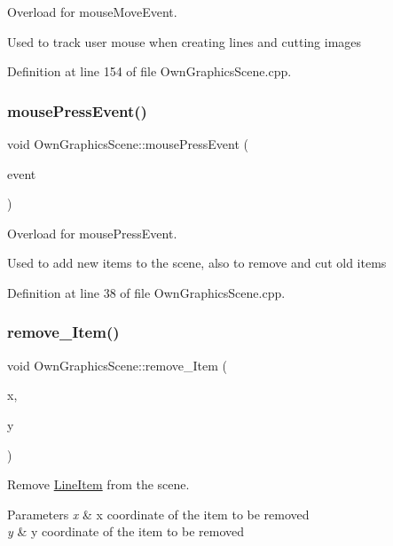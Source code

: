 Overload for mouse\+Move\+Event. 

Used to track user mouse when creating lines and cutting images 

Definition at line 154 of file Own\+Graphics\+Scene.\+cpp.

\mbox{\label{classOwnGraphicsScene_a1a9916971af608d5331483606f72fbe4}} 
\subsubsection{\texorpdfstring{mouse\+Press\+Event()}{mousePressEvent()}}
{\footnotesize\ttfamily void Own\+Graphics\+Scene\+::mouse\+Press\+Event (\begin{DoxyParamCaption}\item[{Q\+Graphics\+Scene\+Mouse\+Event $\ast$}]{event }\end{DoxyParamCaption})}



Overload for mouse\+Press\+Event. 

Used to add new items to the scene, also to remove and cut old items 

Definition at line 38 of file Own\+Graphics\+Scene.\+cpp.

\mbox{\label{classOwnGraphicsScene_a5b4b466a697f83c23294a80067edac23}} 
\subsubsection{\texorpdfstring{remove\+\_\+\+Item()}{remove\_Item()}}
{\footnotesize\ttfamily void Own\+Graphics\+Scene\+::remove\+\_\+\+Item (\begin{DoxyParamCaption}\item[{unsigned}]{x,  }\item[{unsigned}]{y }\end{DoxyParamCaption})}



Remove \mbox{\hyperlink{classLineItem}{Line\+Item}} from the scene. 


\begin{DoxyParams}{Parameters}
{\em x} & x coordinate of the item to be removed \\
\hline
{\em y} & y coordinate of the item to be removed \\
\hline
\end{DoxyParams}


